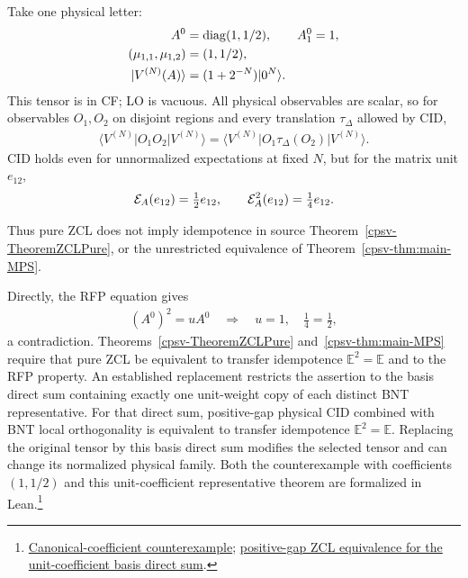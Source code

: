 \documentclass[aps,pra,reprint,nofootinbib,onecolumn]{revtex4-2}
\begin{document}
Take one physical letter:
\begin{align}
	A^0                   & =\operatorname{diag}(1,1/2),\qquad A_1^0=1,\nonumber \\
	(\mu_{1,1},\mu_{1,2}) & =(1,1/2),\nonumber                     \\
	\lvert V^{(N)}(A)\rangle      & =(1+2^{-N})\lvert0^N\rangle.
	\label{eq:single-letter-A}
\end{align}
This tensor is in CF; LO is vacuous. All physical observables
are scalar, so for observables $O_1,O_2$ on disjoint regions and
every translation $\tau_\Delta$ allowed by CID,
\begin{align}
	\langle V^{(N)}|O_1O_2|V^{(N)}\rangle
	=\langle V^{(N)}|O_1\tau_\Delta(O_2)|V^{(N)}\rangle.
	\label{eq:cid-scalar}
\end{align}
CID holds even for unnormalized expectations at fixed $N$, but
for the matrix unit $e_{12}$,
\begin{align}
	\mathcal{E}_A(e_{12})=\tfrac12e_{12},\qquad
	\mathcal{E}_A^2(e_{12})=\tfrac14e_{12}.
	\label{eq:transfer-non-idempotent}
\end{align}
\begin{refutation}
	Thus pure ZCL does not imply idempotence in source
	Theorem~\ref{cpsv-TheoremZCLPure}, or the unrestricted equivalence
	of Theorem~\ref{cpsv-thm:main-MPS}.
\end{refutation}
Directly, the RFP equation gives
\begin{align}
	(A^0)^2=uA^0
	\quad\Longrightarrow\quad u=1,\quad \tfrac14=\tfrac12,
	\label{eq:rfp-pure-contradiction}
\end{align}
a contradiction. Theorems~\ref{cpsv-TheoremZCLPure} and~\ref{cpsv-thm:main-MPS}
require that pure ZCL be equivalent to transfer idempotence $\mathbb E^2=\mathbb E$
and to the RFP property. An established replacement restricts the assertion to
the basis direct sum containing exactly one unit-weight copy of each distinct
BNT representative. For that direct sum, positive-gap physical CID combined with
BNT local orthogonality is equivalent to transfer idempotence $\mathbb E^2=\mathbb E$.
Replacing the original tensor by this basis direct sum modifies the selected
tensor and can change its normalized physical family.
Both the counterexample with coefficients $(1,1/2)$ and this
unit-coefficient representative theorem are formalized in Lean.\footnote{\href{https://sirui-lu.com/TNLean/docs/TNLean/MPS/RFP/BNTWeightCounterexample.html\#MPSTensor.halvedWeightTensor_counterexample_to_unrestricted_zcl_iff_rfp}{Canonical-coefficient counterexample}; \href{https://sirui-lu.com/TNLean/docs/TNLean/MPS/RFP/ZCLReverse.html\#MPSTensor.IsLeftCanonicalBNTPresentation.isPositiveGapBNTZCL_basisDirectSum_iff_isTransferIdempotent}{positive-gap ZCL equivalence for the unit-coefficient basis direct sum}.}
\end{document}
